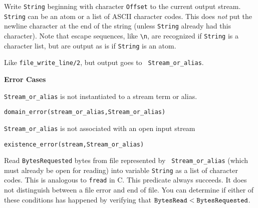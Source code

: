 \begin{description}

   Write {\tt String} beginning with character {\tt Offset} to the
   current output stream. {\tt String} can be an atom or a list of
   ASCII character codes. This does \emph{not} put the newline
   character at the end of the string (unless {\tt String} already had
   this character). Note that escape sequences, like \verb|\n|, are
   recognized if {\tt String} is a character list, but are output as
   is if {\tt String} is an atom.

Like \verb|file_write_line/2|, but output goes to {\tt
Stream\_or\_alias}.  

{\bf Error Cases}
\bi
\item 	{\tt Stream\_or\_alias} is not instantiated to a stream term
or alias.
\bi
\item 	{\tt domain\_error(stream\_or\_alias,Stream\_or\_alias)}
\ei
\item 	{\tt Stream\_or\_alias} is not associated with an open input stream
\bi
\item 	{\tt existence\_error(stream,Stream\_or\_alias)}
\ei
\ei




Read {\tt BytesRequested} bytes from file represented by {\tt
Stream\_or\_alias} (which must already be open for reading) into
variable {\tt String} as a list of character codes. This is analogous
to {\tt fread} in C.  This predicate always succeeds. It does not
distinguish between a file error and end of file.  You can determine
if either of these conditions has happened by verifying that $\tt
BytesRead < BytesRequested$.


\end{description}
